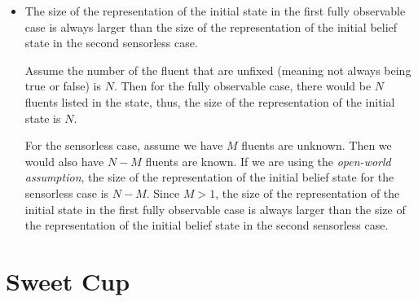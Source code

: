 \documentclass[11pt,a4paper]{article}
\begin{document}
\begin{itemize}
	\item The size of the representation of the initial state in the first fully observable case is always larger than the size of the representation of the initial belief state in the second sensorless case.
	\par Assume the number of the fluent that are unfixed (meaning not always being true or false) is $N$. Then for the fully observable case, there would be $N$ fluents listed in the state, thus, the size of the representation of the initial state is $N$.
	\par For the sensorless case, assume we have $M$ fluents are unknown. Then we would also have $N-M$ fluents are known. If we are using the \textit{open-world assumption}, the size of the representation of the initial belief state for the sensorless case is $N-M$. Since $M>1$, the size of the representation of the initial state in the first fully observable case is always larger than the size of the representation of the initial belief state in the second sensorless case.
\end{itemize}


\section{Sweet Cup}
\end{document}
